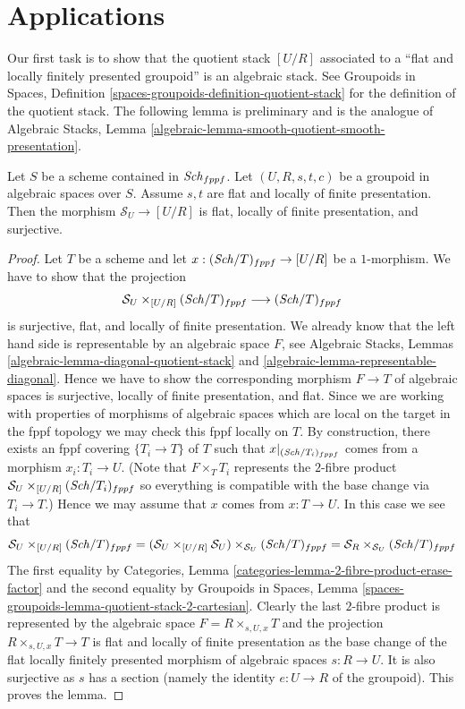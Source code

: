 \section{Applications}
\label{section-applications}

\noindent
Our first task is to show that the quotient stack $[U/R]$ associated to
a ``flat and locally finitely presented groupoid'' is an algebraic stack.
See
Groupoids in Spaces,
Definition \ref{spaces-groupoids-definition-quotient-stack}
for the definition of the quotient stack.
The following lemma is preliminary and is the analogue of
Algebraic Stacks,
Lemma \ref{algebraic-lemma-smooth-quotient-smooth-presentation}.

\begin{lemma}
\label{lemma-flat-quotient-flat-presentation}
Let $S$ be a scheme contained in $\mathit{Sch}_{fppf}$.
Let $(U, R, s, t, c)$ be a groupoid in algebraic spaces over $S$.
Assume $s, t$ are flat and locally of finite presentation.
Then the morphism $\mathcal{S}_U \to [U/R]$ is flat, locally of
finite presentation, and surjective.
\end{lemma}

\begin{proof}
Let $T$ be a scheme and let $x : (\mathit{Sch}/T)_{fppf} \to [U/R]$
be a $1$-morphism. We have to show that the projection
$$
\mathcal{S}_U \times_{[U/R]} (\mathit{Sch}/T)_{fppf}
\longrightarrow
(\mathit{Sch}/T)_{fppf}
$$
is surjective, flat, and locally of finite presentation.
We already know that the left hand side
is representable by an algebraic space $F$, see
Algebraic Stacks, Lemmas \ref{algebraic-lemma-diagonal-quotient-stack} and
\ref{algebraic-lemma-representable-diagonal}.
Hence we have to show the corresponding morphism $F \to T$ of
algebraic spaces is surjective, locally of finite presentation, and flat.
Since we are working with properties of morphisms of algebraic
spaces which are local on the target in the fppf topology we
may check this fppf locally on $T$. By construction, there exists
an fppf covering $\{T_i \to T\}$ of $T$ such that
$x|_{(\mathit{Sch}/T_i)_{fppf}}$ comes from a morphism
$x_i : T_i \to U$. (Note that $F \times_T T_i$ represents the
$2$-fibre product $\mathcal{S}_U \times_{[U/R]} (\mathit{Sch}/T_i)_{fppf}$
so everything is compatible with the base change via $T_i \to T$.)
Hence we may assume that $x$ comes from $x : T \to U$.
In this case we see that
$$
\mathcal{S}_U \times_{[U/R]} (\mathit{Sch}/T)_{fppf}
=
(\mathcal{S}_U \times_{[U/R]} \mathcal{S}_U)
\times_{\mathcal{S}_U} (\mathit{Sch}/T)_{fppf}
=
\mathcal{S}_R \times_{\mathcal{S}_U} (\mathit{Sch}/T)_{fppf}
$$
The first equality by
Categories, Lemma \ref{categories-lemma-2-fibre-product-erase-factor}
and the second equality by
Groupoids in Spaces,
Lemma \ref{spaces-groupoids-lemma-quotient-stack-2-cartesian}.
Clearly the last $2$-fibre product is represented by the algebraic
space $F = R \times_{s, U, x} T$ and the projection
$R \times_{s, U, x} T \to T$ is flat and locally of finite presentation
as the base change of the flat locally finitely presented
morphism of algebraic spaces $s : R \to U$.
It is also surjective as $s$ has a section (namely the identity
$e : U \to R$ of the groupoid).
This proves the lemma.
\end{proof}

